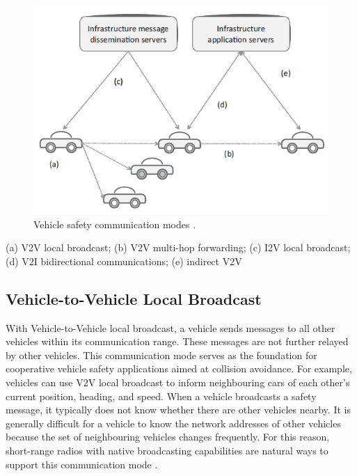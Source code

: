 \documentclass[12pt]{report}
\begin{document}
\begin{figure}[!hb]
	\centerline{\includegraphics{v2v.png}}
	\caption{Vehicle safety communication modes \cite{protocols}. }
	\label{fig}
\end{figure}

(a) V2V local broadcast; (b) V2V multi-hop forwarding; (c) I2V local broadcast; (d) V2I bidirectional communications; (e) indirect V2V

	\subsection{ Vehicle-to-Vehicle Local Broadcast}
	With Vehicle-to-Vehicle local broadcast, a vehicle sends messages to all other vehicles within its communication range. These messages are not further relayed by other vehicles. This communication mode serves as the foundation for cooperative vehicle safety applications aimed at collision avoidance. For
	example, vehicles can use V2V local broadcast to inform neighbouring cars of each other’s current position, heading, and speed. When a vehicle broadcasts a safety message, it typically does not know whether there are other vehicles nearby. It is generally difficult for a vehicle to know the network addresses of other vehicles because the set of neighbouring vehicles changes frequently. For this reason, short-range radios with native broadcasting capabilities are natural ways to support this communication mode \cite{protocols}.
	
\end{document}
